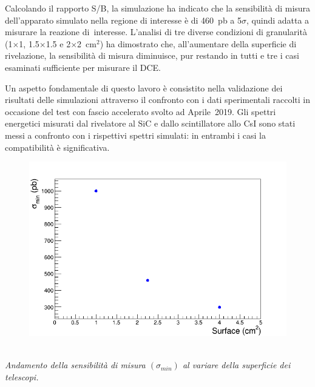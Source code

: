 \documentclass[10pt,foldmark]{leaflet}
\begin{document}
Calcolando il rapporto S/B, la simulazione ha indicato che la sensibilità di misura dell'apparato simulato nella regione di interesse è di 460~pb a 5$\sigma$, quindi adatta a misurare la reazione di~interesse.
L'analisi di tre diverse condizioni di granularità (1$\times$1, 1.5$\times$1.5 e 2$\times$2~$\mbox{cm}^2$) ha dimostrato che, all'aumentare della superficie di rivelazione, la sensibilità di misura diminuisce, pur restando in tutti e tre i casi esaminati sufficiente per misurare il DCE.

Un aspetto fondamentale di questo lavoro è consistito nella validazione dei risultati delle simulazioni attraverso il confronto con i dati sperimentali raccolti in occasione del test con fascio accelerato svolto ad Aprile~2019.
Gli spettri energetici misurati dal rivelatore al SiC e dallo scintillatore allo CsI sono stati messi a confronto con i rispettivi spettri simulati: in entrambi i casi la compatibilità è significativa.
\begin{figure} [!h]
	\centering
	\includegraphics[width=0.7\columnwidth, keepaspectratio]{Grafici_Tesi2/Granularitanew/sigma_min.png}
\end{figure}\\
\textit{Andamento della sensibilità di misura $(\sigma_{min})$ al variare della superficie dei telescopi.}\\
\end{document}
